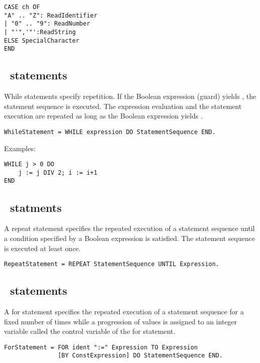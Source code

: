 \documentclass[12pt]{article}
\begin{document}
\begin{lstlisting}[style=example]
CASE ch OF
"A" .. "Z": ReadIdentifier
| "0" .. "9": ReadNumber 
| "'",'"':ReadString 
ELSE SpecialCharacter 
END    
\end{lstlisting}

\subsection{\WHILE\ statements}

While statements specify repetition. If the Boolean expression (guard) yields \TRUE, the statement sequence is executed. The expression evaluation and the statement execution are repeated as long as the Boolean expression yields \TRUE.

\begin{lstlisting}[style=ebnf]
WhileStatement = WHILE expression DO StatementSequence END.
\end{lstlisting} 
    
Examples:
    
\begin{lstlisting}[style=example]
WHILE j > 0 DO
    j := j DIV 2; i := i+1
END
\end{lstlisting} 

\subsection{\REPEAT\ statments}

A repeat statement specifies the repeated execution of a statement sequence until a condition specified by a Boolean expression is satisfied. The statement sequence is executed at least once.

\begin{lstlisting}[style=ebnf]
RepeatStatement = REPEAT StatementSequence UNTIL Expression.
\end{lstlisting} 

\subsection{\FOR\ statements}

A for statement specifies the repeated execution of a statement sequence for a fixed number of times while a progression of values is assigned to an integer variable called the control variable of the for statement.

\begin{lstlisting}[style=ebnf]
ForStatement = FOR ident ":=" Expression TO Expression 
               [BY ConstExpression] DO StatementSequence END.
\end{lstlisting} 
\end{document}
